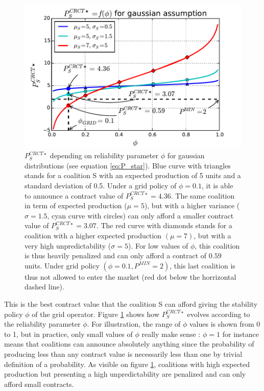 \documentclass[conference]{IEEEtran}
\begin{document}
\begin{figure}
\includegraphics[scale=.6]{gaussian_P_star.pdf}
\caption{$ P_{S}^{CRCT \star} $ depending on reliability parameter $ \phi $ for gaussian distributions (see equation \ref{eq:P_star}). Blue curve with triangles stands for a coalition S with an expected production of 5 units and a standard deviation of 0.5. Under a grid policy of $ \phi = 0.1 $, it is able to announce a contract value of $ P_{S}^{CRCT \star} = 4.36 $. The same coalition in term of expected production ($\mu = 5 $), but with a higher variance ($ \sigma = 1.5 $, cyan curve with circles) can only afford a smaller contract value of $ P_{S}^{CRCT \star} = 3.07 $. The red curve with diamonds stands for a coalition with a higher expected production $(\mu = 7)$, but with a very high unpredictability ($ \sigma = 5 $). For low values of $ \phi $, this coalition is thus heavily penalized and can only afford a contract of $ 0.59 $ units. Under grid policy $ (\phi = 0.1, P^{MIN} = 2) $, this last coalition is thus not allowed to enter the market (red dot below the horrizontal dashed line). }
\label{fig:Gaussian}
\end{figure}

This is the best contract value that the coalition S can afford giving the stability policy $\phi$ of the grid operator. Figure \ref{fig:Gaussian} shows how $ P_{S}^{CRCT \star} $ evolves according to the reliability parameter $ \phi $. For illustration, the range of $ \phi $ values is shown from 0 to 1, but in practice, only small values of $ \phi $ really make sense : $ \phi = 1 $ for instance means that coalitions can announce absolutely anything since the probability of producing less than any contract value is necessarily less than one by trivial definition of a probability. As visible on figure \ref{fig:Gaussian}, coalitions with high expected production but presenting a high unpredictability are penalized and can only afford small contracts.  
\end{document}
